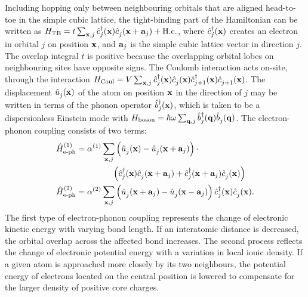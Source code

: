 \documentclass[aps,prl,twocolumn,superscriptaddress,groupedaddress]{revtex4}
\begin{document}
Including hopping only between neighbouring orbitals that are aligned head-to-toe in the simple cubic lattice, the tight-binding part of the Hamiltonian can be written as $H_{\text{TB}} = t  \sum_{{\bf x},j} \hat{c}_{j}^{\dagger}({\bf x}) \hat{c}_{j}^{\phantom \dagger}({\bf x} + {\bf a}_j) + \text{H.c.}$, where $\hat{c}_{j}^{\dagger}({\bf x})$ creates an electron in orbital $j$ on position ${\bf x}$, and ${\bf a}_j$ is the simple cubic lattice vector in direction $j$. The overlap integral $t$ is positive because the overlapping orbital lobes on neighbouring sites have opposite signs. The Coulomb interaction acts on-site, through the interaction $H_{\text{Coul}} = V \sum_{{\bf x},j} \hat{c}_{j}^{\dagger}({\bf x}) \hat{c}_{j}^{\phantom \dagger}({\bf x}) \hat{c}_{j+1}^{\dagger}({\bf x}) \hat{c}_{j+1}^{\phantom \dagger}({\bf x})$. The displacement $\hat{u}_{j}^{\phantom \dagger}({\bf x})$ of the atom on position ${\bf x}$ in the direction of $j$ may be written in terms of the phonon operator $\hat{b}_{j}^{\dagger}({\bf x})$, which is taken to be a dispersionless Einstein mode with $H_{\text{boson}} = \hbar \omega \sum_{{\bf q},j} \hat{b}_{j}^{\dagger}({\bf q}) \hat{b}_{j}^{\phantom \dagger}({\bf q})$. The electron-phonon coupling consists of two terms:
\begin{align}
 \hat{H}^{(1)}_{\text{e-ph}} &=  \alpha^{(1)} \sum_{{\bf x},j} \left(\hat{u}_{j}^{\phantom \dagger}({\bf x}) - \hat{u}_{j}^{\phantom \dagger}({\bf x} + {\bf a}_j) \right) \cdot \notag \\
&~~~~~~~~~~~~~ \left( \hat{c}_{j}^{\dagger}({\bf x}) \hat{c}_{j}^{\phantom \dagger}({\bf x} + {\bf a}_j) + \hat{c}_{j}^{\dagger}({\bf x} + {\bf a}_j) \hat{c}_{j}^{\phantom \dagger}({\bf x}) \right) \notag \\
\hat{H}^{(2)}_{\text{e-ph}} &=  \alpha^{(2)}  \sum_{{\bf x},j} \left( \hat{u}_{j}^{\phantom \dagger}({\bf x} + {\bf a}_j) - \hat{u}_{j}^{\phantom \dagger}({\bf x} - {\bf a}_j) \right) \hat{c}_{j}^{\dagger}({\bf x}) \hat{c}_{j}^{\phantom \dagger}({\bf x}).
\label{eph}
\end{align}
The first type of electron-phonon coupling represents the change of electronic kinetic energy with varying bond length. If an interatomic distance is decreased, the orbital overlap across the affected bond increases. The second process reflects the change of electronic potential energy with a variation in local ionic density. If a given atom is approached more closely by its two neighbours, the potential energy of electrons located on the central position is lowered to compensate for the larger density of positive core charges. 
\end{document}
